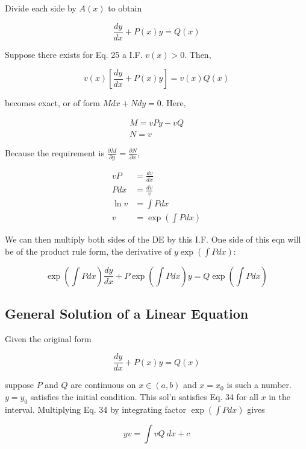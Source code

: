 Divide each side by $A(x)$ to obtain

\begin{equation}
    \frac{dy}{dx}+P(x)y=Q(x)
\end{equation}

Suppose there exists for Eq. 25 a I.F. $v(x)>0$. Then,

\begin{equation}
    v(x)\left[\frac{dy}{dx}+P(x)y\right]=v(x)Q(x)
\end{equation}

becomes exact, or of form $Mdx+Ndy=0$. Here,

\begin{eqnarray}
    M=vPy-vQ\\
    N=v
\end{eqnarray}

Because the requirement is $\frac{\partial M}{\partial y}=\frac{\partial N}{\partial x}$,

\begin{align}
    vP&=\frac{dv}{dx}\\
    Pdx&=\frac{dv}{v}\\
    \ln v&=\int Pdx\\
    v&=\exp(\int Pdx)
\end{align}

We can then multiply both sides of the DE by this I.F. One side of this eqn will be of the product rule form, the derivative of $y\exp (\int Pdx)$:

\begin{equation}
    \exp(\int Pdx)\frac{dy}{dx}+P\exp(\int Pdx)y=Q\exp(\int Pdx)
\end{equation}

\subsection{General Solution of a Linear Equation}

Given the original form

\begin{equation}
    \frac{dy}{dx}+P(x)y=Q(x)
\end{equation}

suppose $P$ and $Q$ are continuous on $x\in (a,b)$ and $x=x_0$ is such a number. $y=y_0$ satisfies the initial condition.
This sol'n satisfies Eq. 34 for all $x$ in the interval. Multiplying Eq. 34 by integrating factor $\exp(\int Pdx)$ gives

\begin{equation}
    yv=\int vQ\:dx + c
\end{equation}

